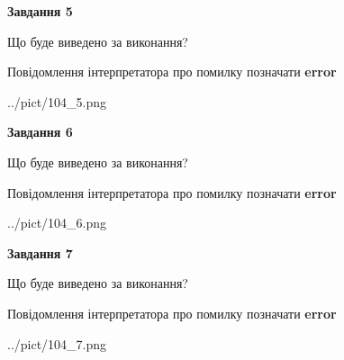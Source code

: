 \documentclass[10pt, ukrainian]{article}
\begin{document}
{\begin {large}
{\begin {center}\textbf{Завдання 5}\end {center}}\par
Що буде виведено за виконання? \par
Повідомлення інтерпретатора про помилку позначати \textbf{error}

\begin{center}
	{../pict/104_5.png}
\end{center}
\newpage

{\begin {center}\textbf{Завдання 6}\end {center}}\par
Що буде виведено за виконання? \par
Повідомлення інтерпретатора про помилку позначати \textbf{error}

\begin{center}
	{../pict/104_6.png}
\end{center}
\newpage

{\begin {center}\textbf{Завдання 7}\end {center}}\par
Що буде виведено за виконання? \par
Повідомлення інтерпретатора про помилку позначати \textbf{error}

\begin{center}
	{../pict/104_7.png}
\end{center}
\newpage

\end {large}}
\end{document}
